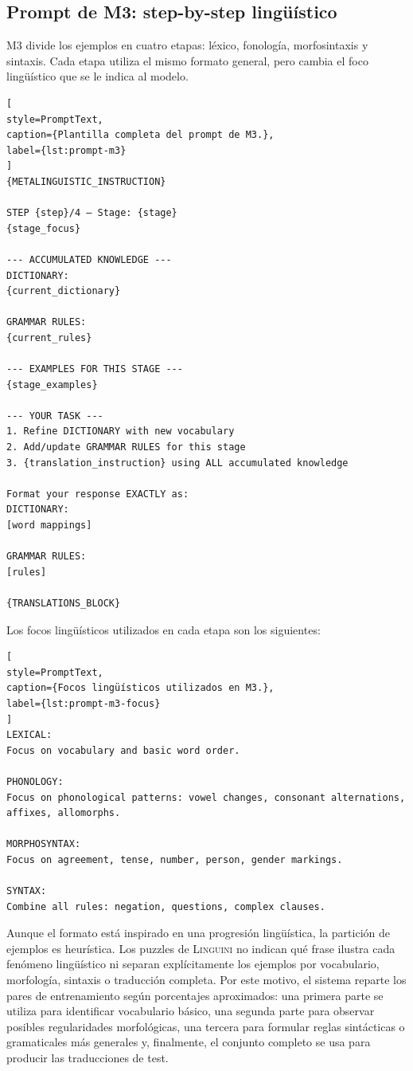 \subsection{Prompt de M3: step-by-step lingüístico}
\label{subsec:prompt-m3}

M3 divide los ejemplos en cuatro etapas: léxico, fonología, morfosintaxis y sintaxis. Cada etapa utiliza el mismo formato general, pero cambia el foco lingüístico que se le indica al modelo.

\begin{lstlisting}[
style=PromptText,
caption={Plantilla completa del prompt de M3.},
label={lst:prompt-m3}
]
{METALINGUISTIC_INSTRUCTION}

STEP {step}/4 — Stage: {stage}
{stage_focus}

--- ACCUMULATED KNOWLEDGE ---
DICTIONARY:
{current_dictionary}

GRAMMAR RULES:
{current_rules}

--- EXAMPLES FOR THIS STAGE ---
{stage_examples}

--- YOUR TASK ---
1. Refine DICTIONARY with new vocabulary
2. Add/update GRAMMAR RULES for this stage
3. {translation_instruction} using ALL accumulated knowledge

Format your response EXACTLY as:
DICTIONARY:
[word mappings]

GRAMMAR RULES:
[rules]

{TRANSLATIONS_BLOCK}
\end{lstlisting}

Los focos lingüísticos utilizados en cada etapa son los siguientes:

\begin{lstlisting}[
style=PromptText,
caption={Focos lingüísticos utilizados en M3.},
label={lst:prompt-m3-focus}
]
LEXICAL:
Focus on vocabulary and basic word order.

PHONOLOGY:
Focus on phonological patterns: vowel changes, consonant alternations, affixes, allomorphs.

MORPHOSYNTAX:
Focus on agreement, tense, number, person, gender markings.

SYNTAX:
Combine all rules: negation, questions, complex clauses.
\end{lstlisting}

Aunque el formato está inspirado en una progresión lingüística, la partición de ejemplos es heurística. Los puzzles de \textsc{Linguini} no indican qué frase ilustra cada fenómeno lingüístico ni separan explícitamente los ejemplos por vocabulario, morfología, sintaxis o traducción completa. Por este motivo, el sistema reparte los pares de entrenamiento según porcentajes aproximados: una primera parte se utiliza para identificar vocabulario básico, una segunda parte para observar posibles regularidades morfológicas, una tercera para formular reglas sintácticas o gramaticales más generales y, finalmente, el conjunto completo se usa para producir las traducciones de test.

